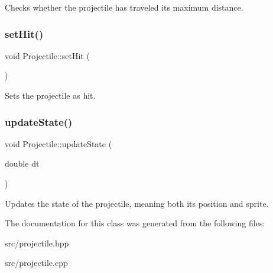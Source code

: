 Checks whether the projectile has traveled its maximum distance. \hypertarget{classProjectile_a6a409515a2e255b25ca80ee031d9a771}{}\label{classProjectile_a6a409515a2e255b25ca80ee031d9a771} 
\subsubsection{\texorpdfstring{set\+Hit()}{setHit()}}
{\footnotesize\ttfamily void Projectile\+::set\+Hit (\begin{DoxyParamCaption}{ }\end{DoxyParamCaption})\hspace{0.3cm}{\ttfamily [inline]}}

Sets the projectile as hit. \hypertarget{classProjectile_aa3781e4c9023c6d0306da7239987f9f7}{}\label{classProjectile_aa3781e4c9023c6d0306da7239987f9f7} 
\subsubsection{\texorpdfstring{update\+State()}{updateState()}}
{\footnotesize\ttfamily void Projectile\+::update\+State (\begin{DoxyParamCaption}\item[{double}]{dt }\end{DoxyParamCaption})}

Updates the state of the projectile, meaning both its position and sprite. 

The documentation for this class was generated from the following files\+:\begin{DoxyCompactItemize}
\item 
src/projectile.\+hpp\item 
src/projectile.\+cpp\end{DoxyCompactItemize}
